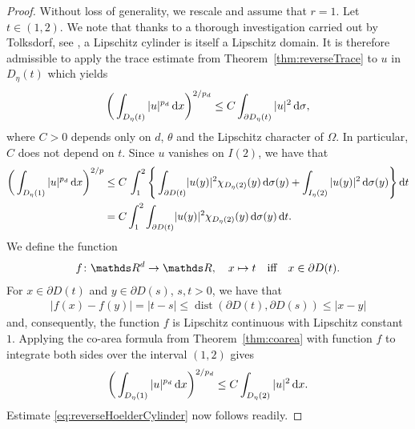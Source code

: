 \begin{proof}
  Without loss of generality, we rescale and assume that $r = 1$.
  Let $t \in (1,2)$. 
  We note that thanks to a thorough investigation carried out by Tolksdorf, see \cite[Lem.\@~1.3.25]{tolksdorf}, a Lipschitz cylinder is itself a Lipschitz domain.
  It is therefore admissible to apply the trace estimate from Theorem~\ref{thm:reverseTrace} to $u$ in $D_\eta(t)$ which yields
  \begin{align*}
    \bigg( \int_{D_\eta(t)} |u|^{p_d} \, {\operatorname{d}\!{x}} \bigg)^{2/p_d} \leq C \int_{\partial D_\eta(t)} |u|^2 \, {\operatorname{d}\!{\sigma}},
  \end{align*}
  where $C > 0$ depends only on $d$, $\theta$ and the Lipschitz character of $\Omega$. In particular, $C$ does not depend on $t$.
  Since $u$ vanishes on $I(2)$, we have that
  \begin{align*}
    \bigg( \int_{D_\eta(1)} |u|^{p_d} \d x \bigg)^{2/p} 
    &\leq C\, \int_1^2 \Bigg\{  \int_{\partial D(t)} \! |u(y)|^2 \chi_{D_\eta(2)}(y) \d\sigma(y) +  \int_{I_\eta(2)} |u(y)|^2 \d \sigma(y) \Bigg\} \d t  \\
    &= C \int_1^2 \int_{\partial D(t)} \! |u(y)|^2 \chi_{D_\eta(2)}(y) \d\sigma(y) \d t.
  \end{align*}
  We define the function
  \begin{align*}
    f \colon \R^d \to \R, \quad x \mapsto t \quad\text{iff}\quad x \in \partial D(t).
  \end{align*}
  For $x \in \partial D(t)$ and $y \in \partial D(s)$, $s,t > 0$, we have that
  \begin{align*}
    |f(x) - f(y)| = |t - s| \leq \operatorname{dist}(\partial D(t), \partial D(s)) \leq |x- y|
  \end{align*}
  and, consequently, the function $f$ is Lipschitz continuous with Lipschitz constant $1$.
  Applying the co-area formula from Theorem~\ref{thm:coarea} with function $f$ to integrate both sides over the interval $(1,2)$ gives
  \begin{align*}
    \bigg( \int_{D_\eta(1)} |u|^{p_d} \, {\operatorname{d}\!{x}} \bigg)^{2/{p_d}} \leq C \int_{D_\eta(2)} |u|^2 \, {\operatorname{d}\!{x}}.
  \end{align*}
  Estimate \eqref{eq:reverseHoelderCylinder} now follows readily.
\end{proof}

